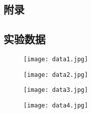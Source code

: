 \documentclass{whureport}
\begin{document}
\begin{multicols}{2}
\printbibliography
\newpage
\section{附录}
\subsection{实验数据}
\begin{figure}[H]
	\centering
	\texttt{[image: data1.jpg]}
\end{figure}
\begin{figure}[H]
	\centering
	\texttt{[image: data2.jpg]}
\end{figure}
\begin{figure}[H]
	\centering
	\texttt{[image: data3.jpg]}
\end{figure}
\begin{figure}[H]
	\centering
	\texttt{[image: data4.jpg]}
\end{figure}

\end{multicols}
\end{document}
